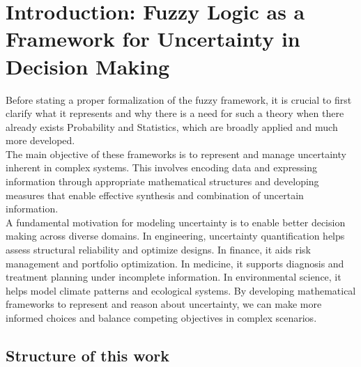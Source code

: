 \setcounter{chapter}{-1}
\chapter{Introduction: Fuzzy Logic as a Framework for Uncertainty in Decision Making}


Before stating a proper formalization of the fuzzy framework, it is crucial to first clarify what it represents and why there is a need for such a theory when there already exists Probability and Statistics, which are broadly applied and much more developed.\\

The main objective of these frameworks is to represent and manage uncertainty inherent in complex systems. This involves encoding data and expressing information through appropriate mathematical structures and developing measures that enable effective synthesis and combination of uncertain information.\\

A fundamental motivation for modeling uncertainty is to enable better decision making across diverse domains. In engineering, uncertainty quantification helps assess structural reliability and optimize designs. In finance, it aids risk management and portfolio optimization. In medicine, it supports diagnosis and treatment planning under incomplete information. In environmental science, it helps model climate patterns and ecological systems. By developing mathematical frameworks to represent and reason about uncertainty, we can make more informed choices and balance competing objectives in complex scenarios.\\







\section{Structure of this work}





